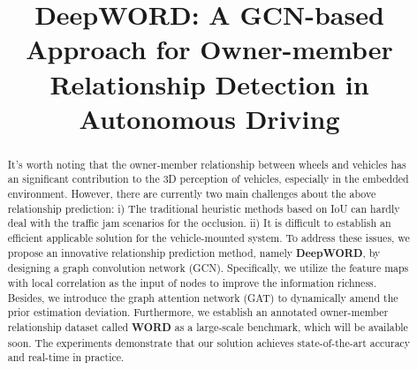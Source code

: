 \documentclass{article}
\begin{document}
\sloppy




\title{DeepWORD: A GCN-based Approach for Owner-member Relationship Detection in Autonomous Driving}
%
\address{$^{1}$Zongmu Technology; $^{2}$Politecnico di Torino; $^{3}$Technical University of Braunschweig\\
{\tt \small zizhang.wu@zongmutech.com}}


\maketitle

% 

% 
% 
% 
% 
% 
\begin{abstract}
 It's worth noting that the owner-member relationship between wheels and vehicles has an significant contribution to the 3D perception of vehicles, especially in the embedded environment. However, there are currently two main challenges about the above relationship prediction: i) The traditional heuristic methods based on IoU can hardly deal with the traffic jam scenarios for the occlusion. ii) It is difficult to establish an efficient applicable solution for the vehicle-mounted system. To address these issues, we propose an innovative relationship prediction method, namely \textbf{DeepWORD}, by designing a graph convolution network (GCN). Specifically, we utilize the feature maps with local correlation as the input of nodes to improve the information richness. Besides, we introduce the graph attention network (GAT) to dynamically amend the prior estimation deviation. Furthermore, we establish an annotated owner-member relationship dataset called \textbf{WORD} as a large-scale benchmark, which will be available soon. The experiments demonstrate that our solution achieves state-of-the-art accuracy and real-time in practice. 

\end{abstract}
\end{document}
